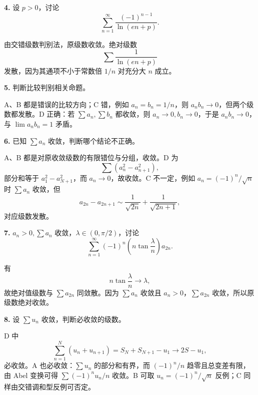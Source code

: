 \begin{problemblock}
\textbf{4.} 设 \(p>0\)，讨论
\[
\sum_{n=1}^{\infty}\frac{(-1)^{n-1}}{\ln(en+p)}.
\]
\end{problemblock}
\begin{solutionblock}
由交错级数判别法，原级数收敛。绝对级数
\[
\sum\frac1{\ln(en+p)}
\]
发散，因为其通项不小于常数倍 \(1/n\) 对充分大 \(n\) 成立。
\end{solutionblock}

\begin{problemblock}
\textbf{5.} 判断比较判别相关命题。
\end{problemblock}
\begin{solutionblock}
A、B 都是错误的比较方向；C 错，例如 \(a_n=b_n=1/n\)，则 \(a_nb_n\to0\)，但两个级数都发散。D 正确：若 \(\sum a_n,\sum b_n\) 都收敛，则 \(a_n\to0,b_n\to0\)，于是 \(a_nb_n\to0\)，与 \(\lim a_nb_n=1\) 矛盾。
\end{solutionblock}

\begin{problemblock}
\textbf{6.} 已知 \(\sum a_n\) 收敛，判断哪个结论不正确。
\end{problemblock}
\begin{solutionblock}
A、B 都是对原收敛级数的有限错位与分组，收敛。D 为
\[
\sum(a_n^2-a_{n+1}^2),
\]
部分和等于 \(a_1^2-a_{N+1}^2\)，而 \(a_n\to0\)，故收敛。C 不一定，例如 \(a_n=(-1)^n/\sqrt n\) 时 \(\sum a_n\) 收敛，但
\[
a_{2n}-a_{2n+1}\sim \frac1{\sqrt{2n}}+\frac1{\sqrt{2n+1}},
\]
对应级数发散。
\end{solutionblock}

\begin{problemblock}
\textbf{7.} \(a_n>0,\sum a_n\) 收敛，\(\lambda\in(0,\pi/2)\)，讨论
\[
\sum_{n=1}^{\infty}(-1)^n\left(n\tan\frac{\lambda}{n}\right)a_{2n}.
\]
\end{problemblock}
\begin{solutionblock}
有
\[
n\tan\frac{\lambda}{n}\to\lambda,
\]
故绝对值级数与 \(\sum a_{2n}\) 同敛散。因为 \(\sum a_n\) 收敛且 \(a_n>0\)，\(\sum a_{2n}\) 收敛，所以原级数绝对收敛。
\end{solutionblock}

\begin{problemblock}
\textbf{8.} 设 \(\sum u_n\) 收敛，判断必收敛的级数。
\end{problemblock}
\begin{solutionblock}
D 中
\[
\sum_{n=1}^N(u_n+u_{n+1})=S_N+S_{N+1}-u_1\to2S-u_1,
\]
必收敛。A 也必收敛：\(\sum u_n\) 的部分和有界，而 \((-1)^n/n\) 趋零且总变差有限，由 Abel 变换可得 \(\sum(-1)^nu_n/n\) 收敛。B 可取 \(u_n=(-1)^n/\sqrt n\) 反例；C 同样由交错调和型反例可否定。
\end{solutionblock}

